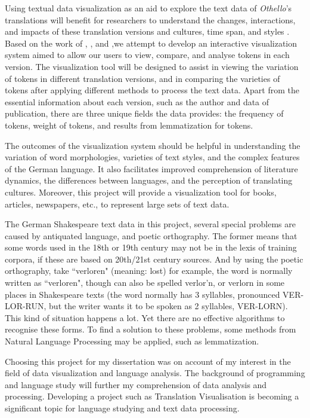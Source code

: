 Using textual data visualization as an aid to explore the text data of \emph{Othello}’s translations will  benefit for researchers to understand the changes, interactions, and impacts of these translation versions and cultures, time span, and styles \cite{Alrehiely2014}. Based on the work of \cite{Geng2015}, \cite{Alrehiely2014}, and \cite{Tom2012},we attempt to develop an interactive visualization system aimed to allow our users to view, compare, and analyse tokens in each version. The visualization tool will be designed to assist in viewing the variation of tokens in different translation versions, and in comparing the varieties of tokens after applying different methods to process the text data. Apart from the essential information about each version, such as the author and data of publication, there are three unique fields the data provides: the frequency of tokens, weight of tokens, and results from lemmatization for tokens.

The outcomes of the visualization system should be helpful in understanding the variation of word morphologies, varieties of text styles, and the complex features of the German language. It also facilitates improved comprehension of literature dynamics, the differences between languages, and the perception of translating cultures. Moreover, this project will provide a visualization tool for books, articles, newspapers, etc., to represent large sets of text data.  

The German Shakespeare text data in this project, several special problems are caused by antiquated language, and poetic orthography. The former means that some words used in the 18th or 19th century may not be in the lexis of training corpora, if these are based on 20th/21st century sources. And by using the poetic orthography, take “verloren" (meaning: lost) for example, the word is normally written as “verloren", though can also be spelled verlor'n, or verlorn in some places in Shakespeare texts (the word normally has 3 syllables, pronounced VER-LOR-RUN, but the writer wants it to be spoken as 2 syllables, VER-LORN). This kind of situation happens a lot. Yet there are no effective algorithms to recognise these forms. To find a solution to these problems, some methods from Natural Language Processing may be applied, such as lemmatization.

Choosing this project for my dissertation was on account of my interest in the field of data visualization and language analysis. The background of programming and language study will further my comprehension of data analysis and processing. Developing a project such as Translation Visualisation is becoming a significant topic for language studying and text data processing.

